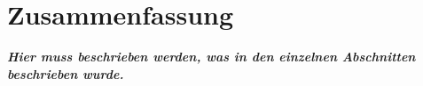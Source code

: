 \chapter{Zusammenfassung} \label{sec:Zusamenfassung}


\textbf{\emph{Hier muss beschrieben werden, was in den einzelnen Abschnitten beschrieben wurde.}}